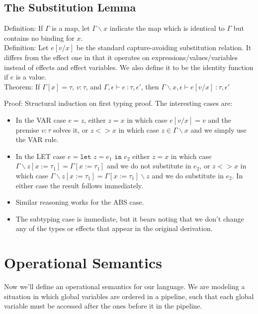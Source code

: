 \documentclass{article}
\begin{document}
\subsection*{The Substitution Lemma}

\noindent Definition: If $\Gamma$ is a map, let $\Gamma \backslash x$ indicate the map which is identical to $\Gamma$ but contains no binding for $x$.
\\

\noindent Definition: Let $e[v/x]$ be the standard capture-avoiding substitution relation. It differs from the effect one in that it operates on expressions/values/variables instead of effects and effect variables. We also define it to be the identity function if $e$ is a value.
\\

\noindent Theorem: If $\Gamma[x] = \tau$, $v : \tau$, and $\Gamma, \epsilon \vdash e\ \colon \tau, \epsilon'$, then $\Gamma\backslash x, \epsilon \vdash e[v/x]\ \colon \tau, \epsilon'$

\noindent Proof: Structural induction on first typing proof. The interesting cases are:

\begin{itemize}
	\item In the VAR case $e = z$, either $z = x$ in which case $e[v/x] = v$ and the premise $v : \tau$ solves it, or $z <> x$ in which case $z \in \Gamma\backslash x$ and we simply use the VAR rule.
	\item In the LET case $e = \texttt{let } z = e_1 \texttt{ in }e_2$ either $z = x$ in which case $\Gamma\backslash z[x := \tau_1] = \Gamma[x := \tau_1]$ and we do not substitute in $e_2$, or $z <> x$ in which case $\Gamma\backslash z[x := \tau_1] = \Gamma[x := \tau_1]\backslash z$ and we do substitute in $e_2$. In either case the result follows immediately.
	\item Similar reasoning works for the ABS case.
	\item The subtyping case is immediate, but it bears noting that we don't change any of the types or effects that appear in the original derivation.
\end{itemize}

\clearpage
\section*{Operational Semantics}

Now we'll define an operational semantics for our language. We are modeling a situation in which global variables are ordered in a pipeline, such that each global variable must be accessed after the ones before it in the pipeline.
\end{document}
